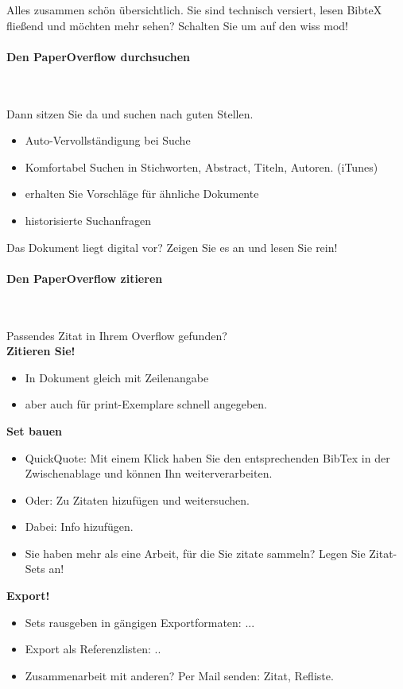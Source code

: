 \documentclass[a4paper,12pt]{article}
\begin{document}
Alles zusammen schön übersichtlich.
Sie sind technisch versiert, lesen BibteX fließend und möchten mehr sehen? Schalten Sie um auf den wiss mod!
\\
\paragraph{Den PaperOverflow durchsuchen}\

Dann sitzen Sie da und suchen nach guten Stellen.
\begin{itemize}
	\item Auto-Vervollständigung bei Suche
	\item Komfortabel Suchen in Stichworten, Abstract, Titeln, Autoren. (iTunes)
	\item erhalten Sie Vorschläge für ähnliche Dokumente
	\item historisierte Suchanfragen
\end{itemize}

Das Dokument liegt digital vor? Zeigen Sie es an und lesen Sie rein!

\paragraph{Den PaperOverflow zitieren}\ 

Passendes Zitat in Ihrem Overflow gefunden? \\

\textbf{Zitieren Sie!} 
\begin{itemize}
	\item In Dokument gleich mit Zeilenangabe
	\item aber auch für print-Exemplare schnell angegeben.
\end{itemize}

\textbf{Set bauen}
\begin{itemize}
	\item QuickQuote: Mit einem Klick haben Sie den entsprechenden BibTex in der Zwischenablage und können Ihn weiterverarbeiten.
	\item Oder: Zu Zitaten hizufügen und weitersuchen.
	\item Dabei: Info hizufügen.
	\item Sie haben mehr als eine Arbeit, für die Sie zitate sammeln? Legen Sie Zitat-Sets an!
\end{itemize}

\textbf{Export!}
\begin{itemize}
	\item Sets rausgeben in gängigen Exportformaten: ...
	\item Export als Referenzlisten: ..
	\item Zusammenarbeit mit anderen? Per Mail senden: Zitat, Refliste.
\end{itemize}
\end{document}
